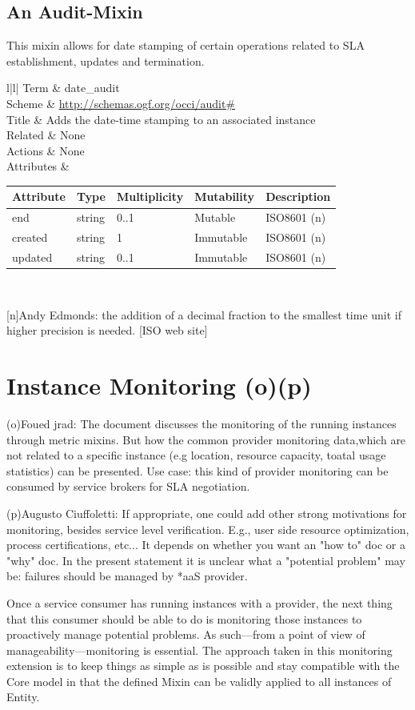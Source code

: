 \documentclass[12pt]{article}  %
\newcommand{\occitemplate}[6]{
\begin{tabular}{l|l|} \hline
Term	&	#1 \\ \hline 
Scheme	&	#2 \\ \hline
Title	& 	#3 \\ \hline
Related &	#4 \\ \hline
Actions & 	#5 \\ \hline
Attributes & #6 \\ \hline
\end{tabular}
}
\begin{document}
\subsection{An Audit-Mixin}

This mixin allows for date stamping of certain operations related to SLA establishment, updates and termination.

\occitemplate
{date\_audit}
{\url{http://schemas.ogf.org/occi/audit\#}}
{Adds the date-time stamping to an associated instance}
{None}
{None}
{
\begin{tabular}{|l|l|l|l|l|} \hline
Attribute & Type & Multiplicity	& Mutability & Description \\ \hline
 	end & string & 0..1 & Mutable & ISO8601 (n) \\ \hline
 	created & string & 1 & Immutable & ISO8601 (n) \\ \hline
 	updated	& string & 0..1	& Immutable & ISO8601 (n) \\ \hline
\end{tabular} 
}

{
\color{blue}
[n]Andy Edmonds:
the addition of a decimal fraction to the smallest time unit if higher precision is needed. [ISO web site]
}

\section{Instance Monitoring (o)(p)}

{
\color{blue}
(o)Foued jrad:
The document discusses the monitoring of the running instances through metric mixins. But how the common provider monitoring data,which are not related to a specific instance (e.g location, resource capacity, toatal usage statistics) can be presented. Use case:  this kind of provider monitoring can be consumed by service brokers for SLA negotiation.

(p)Augusto Ciuffoletti:
If appropriate, one could add other strong motivations for monitoring, besides service level verification. E.g., user side resource optimization, process certifications, etc... It depends on whether you want an "how to" doc or a "why" doc. In the present statement it is unclear what a "potential problem" may be: failures should be managed by *aaS provider.
}

Once a service consumer has running instances with a provider, the next thing that this consumer should be able to do is monitoring those instances to proactively manage potential problems. As such—from a point of view of manageability—monitoring is essential. The approach taken in this monitoring extension is to keep things as simple as is possible and stay compatible with the Core model in that the defined Mixin can be validly applied to all instances of Entity.
\end{document}
